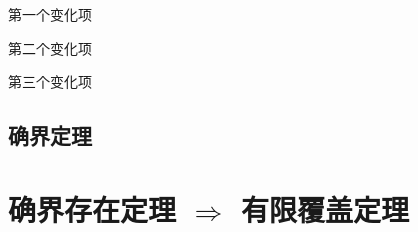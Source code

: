 \documentclass[12pt, a4paper, oneside, UTF8]{ctexbook}
\begin{document}
\begin{change2}
	\item 第一个变化项
	\item 第二个变化项
	\item 第三个变化项
\end{change2}

	\subsection{确界定理}
	
	
	
\section*{确界存在定理 $\Rightarrow$ 有限覆盖定理}


	\ifx\allfiles\undefined
\end{document}
